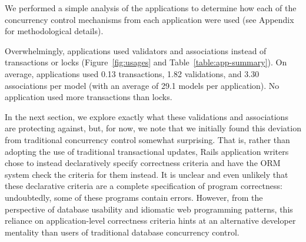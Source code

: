  We performed a simple analysis of the
applications to determine how each of the concurrency control
mechanisms from each application were used (see Appendix for
methodological details).

Overwhelmingly, applications used validators and associations instead
of transactions or locks (Figure~\ref{fig:usages} and
Table~\ref{table:app-summary}). On average, applications used 0.13 transactions, 1.82
validations, and 3.30 associations per model (with an average of 29.1
models per application). No application used more transactions
than locks.

In the next section, we explore exactly what these validations and
associations are protecting against, but, for now, we note that we
initially found this deviation from traditional concurrency control
somewhat surprising. That is, rather than adopting the use of
traditional transactional updates, Rails application writers chose to
instead declaratively specify correctness criteria and have the ORM
system check the criteria for them instead. It is unclear and even
unlikely that these declarative criteria are a complete specification
of program correctness: undoubtedly, some of these programs contain
errors. However, from the perspective of database usability and
idiomatic web programming patterns, this reliance on application-level
correctness criteria hints at an alternative developer mentality than
users of traditional database concurrency control.


